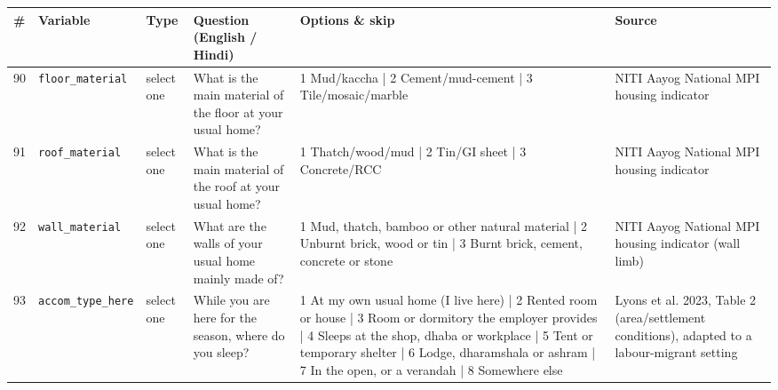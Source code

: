 \documentclass[9pt,a4paper,landscape]{article}
\begin{document}
\begin{longtable}{@{}p{0.5cm}p{3.3cm}p{1.7cm}p{7.3cm}p{5.6cm}p{5.4cm}@{}}
\toprule \footnotesize\textbf{\#} & \footnotesize\textbf{Variable} & \footnotesize\textbf{Type} & \footnotesize\textbf{Question (English / Hindi)} & \footnotesize\textbf{Options {\&} skip} & \footnotesize\textbf{Source}\\ \midrule
\endhead
\footnotesize 90 & \footnotesize\texttt{floor\_material} & \scriptsize select one & \footnotesize What is the main material of the floor at your usual home?\par\vspace{1pt}{\footnotesize\color{hdr}{\hifont आपके असली घर में फ़र्श मुख्य रूप से किस चीज़ का है?}} & \scriptsize 1 Mud/kaccha | 2 Cement/mud-cement | 3 Tile/mosaic/marble & \scriptsize NITI Aayog National MPI housing indicator\\
\footnotesize 91 & \footnotesize\texttt{roof\_material} & \scriptsize select one & \footnotesize What is the main material of the roof at your usual home?\par\vspace{1pt}{\footnotesize\color{hdr}{\hifont आपके असली घर की छत मुख्य रूप से किस चीज़ की है?}} & \scriptsize 1 Thatch/wood/mud | 2 Tin/GI sheet | 3 Concrete/RCC & \scriptsize NITI Aayog National MPI housing indicator\\
\footnotesize 92 & \footnotesize\texttt{wall\_material} & \scriptsize select one & \footnotesize What are the walls of your usual home mainly made of?\par\vspace{1pt}{\footnotesize\color{hdr}{\hifont आपके असली घर की दीवारें मुख्य रूप से किस चीज़ की बनी हैं?}} & \scriptsize 1 Mud, thatch, bamboo or other natural material | 2 Unburnt brick, wood or tin | 3 Burnt brick, cement, concrete or stone & \scriptsize NITI Aayog National MPI housing indicator (wall limb)\\
\footnotesize 93 & \footnotesize\texttt{accom\_type\_here} & \scriptsize select one & \footnotesize While you are here for the season, where do you sleep?\par\vspace{1pt}{\footnotesize\color{hdr}{\hifont सीज़न में यहाँ रहते हुए आप कहाँ सोते हैं?}} & \scriptsize 1 At my own usual home (I live here) | 2 Rented room or house | 3 Room or dormitory the employer provides | 4 Sleeps at the shop, dhaba or workplace | 5 Tent or temporary shelter | 6 Lodge, dharamshala or ashram | 7 In the open, or a verandah | 8 Somewhere else & \scriptsize Lyons et al. 2023, Table 2 (area/settlement conditions), adapted to a labour-migrant setting\\

\end{longtable}
\end{document}
